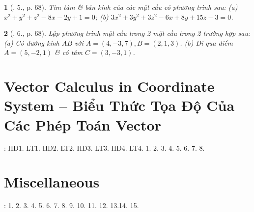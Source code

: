 \documentclass{article}
\newtheorem{baitoan}{}
\begin{document}
\begin{baitoan}[\cite{SGK_Toan_12_hinh_hoc_co_ban}, 5., p. 68]
	Tìm tâm \& bán kính của các mặt cầu có phương trình sau: (a) $x^2 + y^2 + z^2 - 8x - 2y + 1 = 0$; (b) $3x^2 + 3y^2 + 3z^2 - 6x + 8y + 15z - 3 = 0$.
\end{baitoan}

\begin{baitoan}[\cite{SGK_Toan_12_hinh_hoc_co_ban}, 6., p. 68]
	Lập phương trình mặt cầu trong 2 mặt cầu trong 2 trường hợp sau: (a) Có đường kính $AB$ với $A = (4,-3,7),B = (2,1,3)$. (b) Đi qua điểm $A = (5,-2,1)$ \& có tâm $C = (3,-3,1)$.
\end{baitoan}


\section{Vector Calculus in Coordinate System -- Biểu Thức Tọa Độ Của Các Phép Toán Vector}
\cite[Chap. II, \S3, pp. 74--81]{SGK_Toan_12_Canh_Dieu_tap_1}: HD1. LT1. HD2. LT2. HD3. LT3. HD4. LT4. 1. 2. 3. 4. 5. 6. 7. 8.


\section{Miscellaneous}
\cite[BTCCII, pp. 82--83]{SGK_Toan_12_Canh_Dieu_tap_1}: 1. 2. 3. 4. 5. 6. 7. 8. 9. 10. 11. 12. 13.14. 15.


\printbibliography[heading=bibintoc]
	
\end{document}
